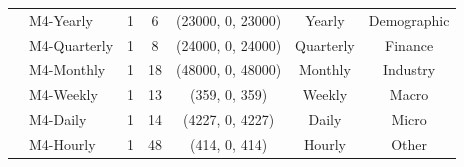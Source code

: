 \begin{table}[h]
{\begin{threeparttable}
\begin{tabular}{c|l|c|c|c|c|c}
          & M4-Yearly & 1 & 6 & (23000, 0, 23000) & Yearly & Demographic \\ 
          & M4-Quarterly & 1 & 8 & (24000, 0, 24000) & Quarterly & Finance \\ 
          & M4-Monthly & 1 & 18 & (48000, 0, 48000) & Monthly & Industry \\ 
          & M4-Weekly & 1 & 13 & (359, 0, 359) & Weekly & Macro \\ 
          & M4-Daily & 1 & 14 & (4227, 0, 4227) & Daily & Micro \\ 
          & M4-Hourly & 1 & 48 & (414, 0, 414) & Hourly & Other \\
        \hline
      \end{tabular}
    \end{threeparttable}
  }
\end{table}
